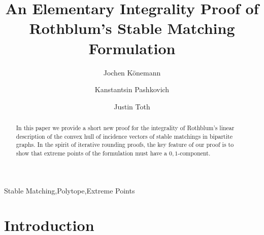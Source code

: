 \documentclass[3p,times]{elsarticle}
\begin{document}
\begin{frontmatter}



\title{An Elementary Integrality
  Proof of Rothblum's Stable Matching Formulation}
\author[co]{Jochen K\"{o}nemann}
\author[co]{Kanstantsin Pashkovich}
\author[co]{Justin Toth}
\address[co]{Department of Combinatorics and Optimization, University of Waterloo, Canada}


\begin{abstract}
  In this paper we provide a short new proof for the integrality of
  Rothblum's linear description of the convex hull of incidence
  vectors of stable matchings in bipartite graphs. In the spirit of
  iterative rounding proofs, the key feature of our proof is to show
  that extreme points of the formulation must have a $0,1$-component. 
\end{abstract}
\begin{keyword}
Stable Matching\sep Polytope\sep Extreme Points
\end{keyword}
\end{frontmatter}

\section{Introduction}
\end{document}
